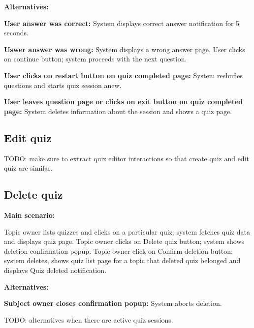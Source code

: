 \documentclass[
    english, %
]{VUMIFPSkursinis}
\begin{document}
\noindent\textbf{\fontsize{13}{15}\selectfont Alternatives:}

\textbf{User answer was correct:} System displays correct answer notification for 5 seconds.

\textbf{Uswer answer was wrong:} System displays a wrong answer page. User clicks on continue button; system proceeds with the next question.

\textbf{User clicks on restart button on quiz completed page:} System reshufles questions and starts quiz session anew.

\textbf{User leaves question page or clicks on exit button on quiz completed page:} System deletes information about the session and shows a quiz page.

\subsection{Edit quiz}

TODO: make sure to extract quiz editor interactions so that create quiz and edit quiz are similar.

\subsection{Delete quiz}

\noindent\textbf{\fontsize{13}{15}\selectfont Main scenario:}

Topic owner lists quizzes and clicks on a particular quiz; system fetches quiz data and displays quiz page. Topic owner clicks on Delete quiz button; system shows deletion confirmation popup. Topic owner click on Confirm deletion button; system deletes, shows quiz list page for a topic that deleted quiz belonged and displays Quiz deleted notification.

\noindent\textbf{\fontsize{13}{15}\selectfont Alternatives:}

\textbf{Subject owner closes confirmation popup:} System aborts deletion.

TODO: alternatives when there are active quiz sessions.

\listoffigures
\printbibliography[heading=bibintoc]
\end{document}
